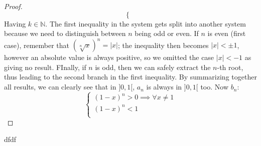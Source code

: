 \begin{proposition}
\begin{proof}
\begin{equation*}
\begin{cases}
\end{cases}
\end{equation*}
Having $k \in \mathbb{N}$. The first inequality in the system gets split into another
system because we need to distinguish between $n$ being odd or even. If $n$ is even
(first case), remember that $\left(\sqrt[n]{x}\right)^n = |x|$; the inequality then
becomes $|x| < \pm 1$, however an absolute value is always positive, so we omitted
the case $|x| < -1$ as giving no result.
FInally, if $n$ is odd, then we can safely extract the $n$-th root, thus leading to the
second branch in the first inequality. By summarizing together all results, we can
clearly see that in $]0,1[$, $a_n$ is always in $]0,1[$ too. Now $b_n$:
\begin{equation*}
\begin{cases}
(1-x)^n > 0 \implies \forall x \neq 1\\
(1-x)^n < 1\\
\end{cases}
\end{equation*}
\end{proof}
\end{proposition}
dfdf
